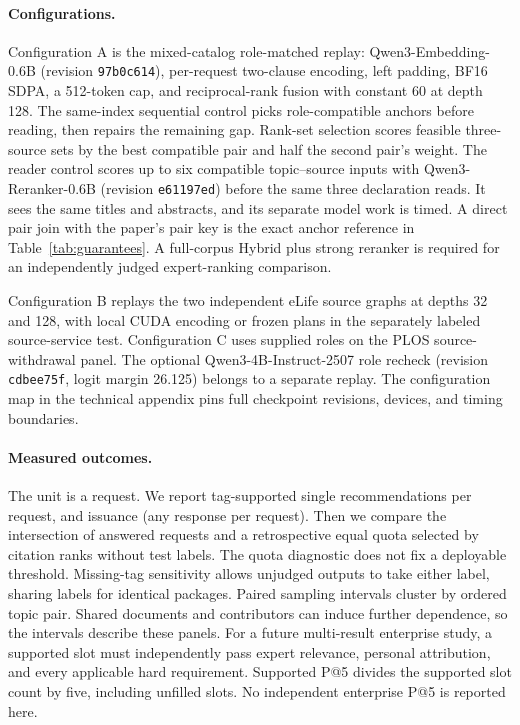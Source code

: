 \documentclass[sigconf,natbib=true,anonymous=true,pbalance=true]{acmart}
\begin{document}
\paragraph{Configurations.}
Configuration A is the mixed-catalog role-matched replay: Qwen3-Embedding-0.6B (revision \texttt{97b0c614}), per-request two-clause encoding, left padding, BF16 SDPA, a 512-token cap, and reciprocal-rank fusion with constant 60 at depth 128. The same-index sequential control picks role-compatible anchors before reading, then repairs the remaining gap. Rank-set selection scores feasible three-source sets by the best compatible pair and half the second pair's weight. The reader control scores up to six compatible topic--source inputs with Qwen3-Reranker-0.6B (revision \texttt{e61197ed}) before the same three declaration reads. It sees the same titles and abstracts, and its separate model work is timed. A direct pair join with the paper's pair key is the exact anchor reference in Table~\ref{tab:guarantees}. A full-corpus Hybrid plus strong reranker is required for an independently judged expert-ranking comparison.

Configuration B replays the two independent eLife source graphs at depths 32 and 128, with local CUDA encoding or frozen plans in the separately labeled source-service test. Configuration C uses supplied roles on the PLOS source-withdrawal panel. The optional Qwen3-4B-Instruct-2507 role recheck (revision \texttt{cdbee75f}, logit margin 26.125) belongs to a separate replay. The configuration map in the technical appendix pins full checkpoint revisions, devices, and timing boundaries.

\paragraph{Measured outcomes.}
The unit is a request. We report tag-supported single recommendations per request, and issuance (any response per request). Then we compare the intersection of answered requests and a retrospective equal quota selected by citation ranks without test labels. The quota diagnostic does not fix a deployable threshold. Missing-tag sensitivity allows unjudged outputs to take either label, sharing labels for identical packages. Paired sampling intervals cluster by ordered topic pair. Shared documents and contributors can induce further dependence, so the intervals describe these panels. For a future multi-result enterprise study, a supported slot must independently pass expert relevance, personal attribution, and every applicable hard requirement. Supported P@5 divides the supported slot count by five, including unfilled slots. No independent enterprise P@5 is reported here.
\end{document}

